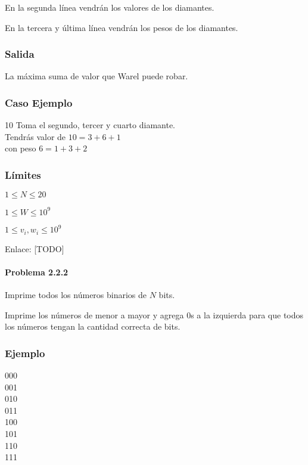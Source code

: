 En la segunda línea vendrán los valores de los diamantes.

En la tercera y última línea vendrán los pesos de los diamantes.
\subsubsection*{Salida}
La máxima suma de valor que Warel puede robar.

\subsubsection*{Caso Ejemplo} 
\begin{casebox3}
	{10}
	{
		Toma el segundo, tercer y cuarto diamante. \\
		Tendrás valor de \(10=3+6+1\) \\
		con peso \(6=1+3+2\)
	}
\end{casebox3}

\subsubsection*{Límites}

\begin{plimits}
	\item \(1\leq N\leq 20 \)
	\item \(1\leq W\leq 10^9 \)
	\item \(1\leq v_i, w_i\leq 10^9 \)
\end{plimits}

Enlace: [TODO]

\problembreak

\paragraph{Problema 2.2.2} Imprime todos los números binarios de \(N\) bits. 

Imprime los números de menor a mayor y agrega 0s a la izquierda para que todos los números tengan la cantidad correcta de bits.

\subsubsection*{Ejemplo}
\begin{casebox2}
	{
		000 \\
	  	001 \\
	  	010 \\
	  	011 \\
	  	100 \\
	  	101 \\
	  	110 \\
	  	111 \\
	}
	\hline
\end{casebox2}

